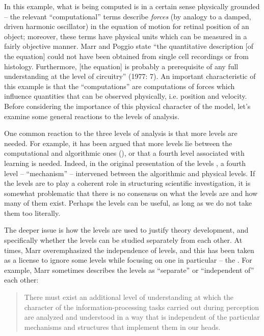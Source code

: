 In this example, what is being computed is in a certain sense physically ground\-ed -- the relevant “computational” terms describe \textit{forces} (by analogy to a damped, driven harmonic oscillator) in the equation of motion for retinal position of an object; moreover, these terms have physical units which can be measured in a fairly objective manner. Marr and Poggio state “the quantitative description [of the equation] could not have been obtained from single cell recordings or from histology. Furthermore, [the equation] is probably a prerequisite of any full understanding at the level of circuitry” (1977: 7). An important characteristic of this example is that the “computations” are computations of forces which influence quantities that can be observed physically, i.e. position and velocity. Before considering the importance of this physical character of the model, let's examine some general reactions to the levels of analysis.

One common reaction to the three levels of analysis is that more levels are needed. For example, it has been argued that more levels lie between the computational and algorithmic ones (\citealt{GriffithsEtAl2015,Pylyshyn1984}), or that a fourth level associated with learning is needed. Indeed, in the original presentation of the levels \citep{MarrPoggio1977}, a fourth level --  “mechanism” -- intervened between the algorithmic and physical levels. If the levels are to play a coherent role in structuring scientific investigation, it is somewhat problematic that there is no consensus on what the levels are and how many of them exist. Perhaps the levels can be useful, as long as we do not take them too literally.

The deeper issue is how the levels are used to justify theory development, and specifically whether the levels can be studied separately from each other. At times, Marr overemphasized the independence of levels, and this has been taken as a license to ignore some levels while focusing on one in particular -- the . For example, Marr sometimes describes the levels as “separate” or “independent of” each other:

\begin{quote} 
There must exist an additional level of understanding at which the character of the information-processing tasks carried out during perception are analyzed and understood in a way that is independent of the particular mechanisms and structures that implement them in our heads. \citep[19]{Marr1982}
\end{quote}

